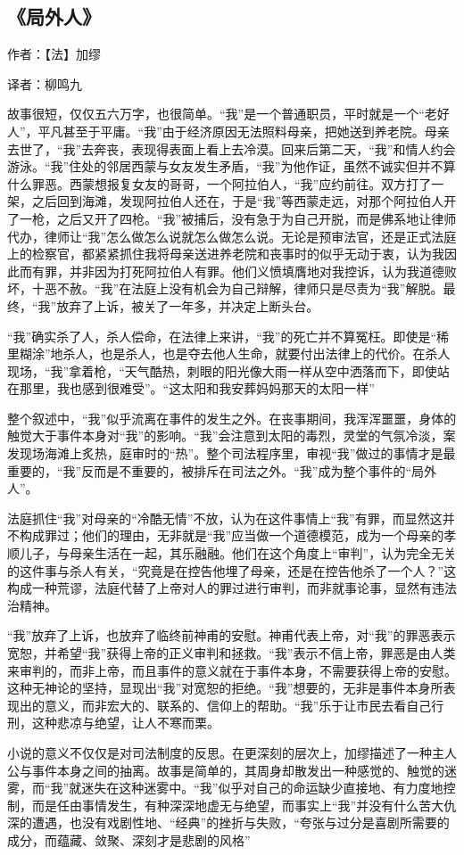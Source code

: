 \subsection{《局外人》}

作者：【法】加缪

译者：柳鸣九

故事很短，仅仅五六万字，也很简单。“我”是一个普通职员，平时就是一个“老好人”，平凡甚至于平庸。“我”由于经济原因无法照料母亲，把她送到养老院。母亲去世了，“我”去奔丧，表现得表面上看上去冷漠。回来后第二天，“我”和情人约会游泳。“我”住处的邻居西蒙与女友发生矛盾，“我”为他作证，虽然不诚实但并不算什么罪恶。西蒙想报复女友的哥哥，一个阿拉伯人，“我”应约前往。双方打了一架，之后回到海滩，发现阿拉伯人还在，于是“我”等西蒙走远，对那个阿拉伯人开了一枪，之后又开了四枪。“我”被捕后，没有急于为自己开脱，而是佛系地让律师代办，律师让“我”怎么做怎么说就怎么做怎么说。无论是预审法官，还是正式法庭上的检察官，都紧紧抓住我将母亲送进养老院和丧事时的似乎无动于衷，认为我因此而有罪，并非因为打死阿拉伯人有罪。他们义愤填膺地对我控诉，认为我道德败坏，十恶不赦。“我”在法庭上没有机会为自己辩解，律师只是尽责为“我”解脱。最终，“我”放弃了上诉，被关了一年多，并决定上断头台。

“我”确实杀了人，杀人偿命，在法律上来讲，“我”的死亡并不算冤枉。即使是“稀里糊涂”地杀人，也是杀人，也是夺去他人生命，就要付出法律上的代价。在杀人现场，“我”拿着枪，“天气酷热，刺眼的阳光像大雨一样从空中洒落而下，即使站在那里，我也感到很难受”。“这太阳和我安葬妈妈那天的太阳一样”

整个叙述中，“我”似乎流离在事件的发生之外。在丧事期间，我浑浑噩噩，身体的触觉大于事件本身对“我”的影响。“我”会注意到太阳的毒烈，灵堂的气氛冷淡，案发现场海滩上炙热，庭审时的“热”。整个司法程序里，审视“我”做过的事情才是最重要的，“我”反而是不重要的，被排斥在司法之外。“我”成为整个事件的“局外人”。

法庭抓住“我”对母亲的“冷酷无情”不放，认为在这件事情上“我”有罪，而显然这并不构成罪过；他们的理由，无非就是“我”应当做一个道德模范，成为一个母亲的孝顺儿子，与母亲生活在一起，其乐融融。他们在这个角度上“审判”，认为完全无关的这件事与杀人有关，“究竟是在控告他埋了母亲，还是在控告他杀了一个人？”这构成一种荒谬，法庭代替了上帝对人的罪过进行审判，而非就事论事，显然有违法治精神。

“我”放弃了上诉，也放弃了临终前神甫的安慰。神甫代表上帝，对“我”的罪恶表示宽恕，并希望“我”获得上帝的正义审判和拯救。“我”表示不信上帝，罪恶是由人类来审判的，而非上帝，而且事件的意义就在于事件本身，不需要获得上帝的安慰。这种无神论的坚持，显现出“我”对宽恕的拒绝。“我”想要的，无非是事件本身所表现出的意义，而非宏大的、联系的、信仰上的帮助。“我”乐于让市民去看自己行刑，这种悲凉与绝望，让人不寒而栗。

小说的意义不仅仅是对司法制度的反思。在更深刻的层次上，加缪描述了一种主人公与事件本身之间的抽离。故事是简单的，其周身却散发出一种感觉的、触觉的迷雾，而“我”就迷失在这种迷雾中。“我”似乎对自己的命运缺少直接地、有力度地控制，而是任由事情发生，有种深深地虚无与绝望，而事实上“我”并没有什么苦大仇深的遭遇，也没有戏剧性地、“经典”的挫折与失败，“夸张与过分是喜剧所需要的成分，而蕴藏、敛聚、深刻才是悲剧的风格”